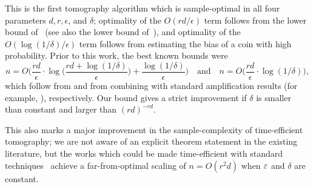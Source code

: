 \documentclass{article}
\begin{document}
This is the first tomography algorithm which is sample-optimal in all four parameters $d, r, \epsilon$, and $\delta$;
optimality of the $O(rd/\epsilon)$ term follows from the lower bound of~\cite{Yue23} (see also the lower bound of~\cite{SSW25}),
and optimality of the $O(\log(1/\delta)/\epsilon)$ term follows from estimating the bias of a coin with high probability.
Prior to this work, the best known bounds were
\begin{equation*}
    n = O\Big(\frac{rd}{\epsilon} \cdot \log\Big(\frac{rd + \log(1/\delta)}{\epsilon}\Big) + \frac{\log(1/\delta)}{\epsilon}\Big)
    \quad \text{and} \quad
    n = O\Big(\frac{rd}{\epsilon} \cdot \log(1/\delta)\Big),
\end{equation*}
which follow from \cite[Equation (14)]{HHJ+16} and from combining \cite[Theorem 1.6]{PSW25} with standard amplification results (for example, \cite[Proposition 2.4]{HKOT23}), respectively.
Our bound gives a strict improvement if $\delta$ is smaller than constant and larger than $(rd)^{-rd}$.

This also marks a major improvement in the sample-complexity of time-efficient tomography; we are not aware of an explicit theorem statement in the existing literature, but the works which could be made time-efficient with standard techniques~\cite{GKKT20,KRT14} achieve a far-from-optimal scaling of $n = O(r^2 d)$ when $\varepsilon$ and $\delta$ are constant.
\end{document}
